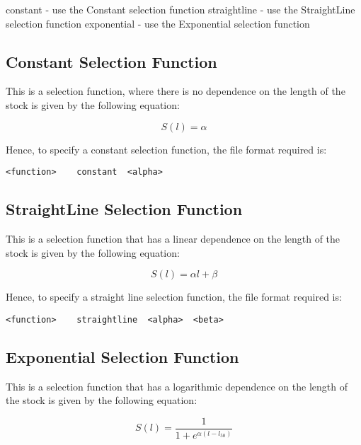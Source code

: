 \documentclass[10pt,twoside]{book}
\begin{document}
\bigskip
constant - use the Constant selection function\newline
straightline - use the StraightLine selection function\newline
exponential - use the Exponential selection function

\subsection{Constant Selection Function}
This is a selection function, where there is no dependence on the length of the stock is given by the following equation:

\begin{equation}\label{eq:constsel}
S(l) = \alpha
\end{equation}

Hence, to specify a constant selection function, the file format required is:

{\small\begin{verbatim}
<function>    constant  <alpha>
\end{verbatim}}

\subsection{StraightLine Selection Function}
This is a selection function that has a linear dependence on the length of the stock is given by the following equation:

\begin{equation}\label{eq:straightsel}
S(l) = \alpha l + \beta
\end{equation}

\bigskip
Hence, to specify a straight line selection function, the file format required is:

{\small\begin{verbatim}
<function>    straightline  <alpha>  <beta>
\end{verbatim}}

\subsection{Exponential Selection Function}
This is a selection function that has a logarithmic dependence on the length of the stock is given by the following equation:

\begin{equation}\label{eq:expsel}
S(l) = \frac{1}{1 + e^{ \alpha (l - l_{50})}}
\end{equation}
\end{document}
